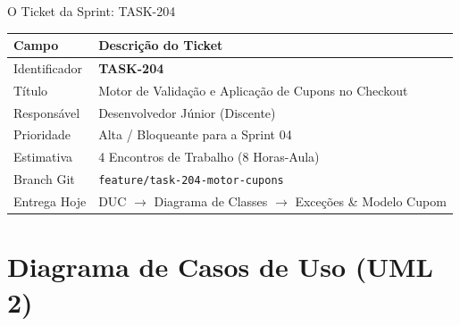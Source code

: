 \documentclass[10pt]{beamer}
\begin{document}
\begin{frame}{O Ticket da Sprint: TASK-204}
    \begin{table}[h]
    \centering
    \footnotesize
    \begin{tabular}{ll}
        \toprule
        \textbf{Campo} & \textbf{Descrição do Ticket} \\
        \midrule
        Identificador & \textbf{TASK-204} \\
        Título & Motor de Validação e Aplicação de Cupons no Checkout \\
        Responsável & Desenvolvedor Júnior (Discente) \\
        Prioridade & Alta / Bloqueante para a Sprint 04 \\
        Estimativa & 4 Encontros de Trabalho (8 Horas-Aula) \\
        Branch Git & \texttt{feature/task-204-motor-cupons} \\
        Entrega Hoje & DUC $\rightarrow$ Diagrama de Classes $\rightarrow$ Exceções \& Modelo Cupom \\
        \bottomrule
    \end{tabular}
    \end{table}
\end{frame}

\section{Diagrama de Casos de Uso (UML 2)}
\end{document}
